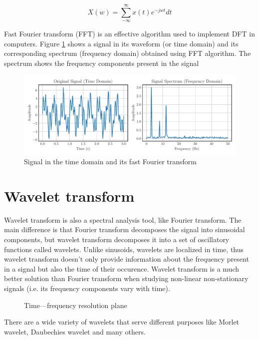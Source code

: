 \begin{equation}
    X(w) = \sum_{-\infty}^{\infty}x(t)e^{-jwt}dt
    \label{equation:discrete-fourier-transform}
\end{equation}

Fast Fourier transform (FFT) is an effective algorithm used to implement DFT in computers. Figure \ref{figure:fft} shows a signal in its waveform (or time domain) and its corresponding spectrum (frequency domain) obtained using FFT algorithm. The spectrum shows the frequency components present in the signal

\begin{figure}[H]
    \centering
    \includegraphics[width=.9\linewidth]{figures/plots/fft.pdf}
    \caption{Signal in the time domain and its fast Fourier transform}
    \label{figure:fft}
\end{figure}

\section{Wavelet transform}
Wavelet transform is also a spectral analysis tool, like Fourier transform. The main difference is that Fourier transform decomposes the signal into sinusoidal components, but wavelet transform decomposes it into a set of oscillatory functions called wavelets. Unlike sinusoids, wavelets are localized in time, thus wavelet transform doesn't only provide information about the frequency present in a signal but also the time of their occurence. Wavelet transform is a much better solution than Fourier transform when studying non-linear non-stationary signals (i.e. its frequency components vary with time).

\begin{figure}[H]
    \centering
    
    \caption{Time—frequency resolution plane}
    \label{fig:time-frequency-plane}
\end{figure}

There are a wide variety of wavelets that serve different purposes like Morlet wavelet, Daubechies wavelet and many others. 

